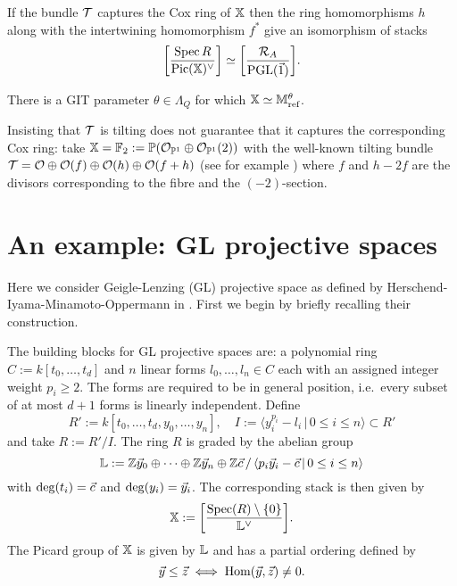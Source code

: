 \documentclass[12pt]{amsart}
\begin{document}
\begin{corollary}
If the bundle $\mathcal{T}$ captures the Cox ring of $\mathbb{X}$ then the ring homomorphisms $h$ along with the intertwining homomorphism $f^*$ give an isomorphism of stacks $$\bigg[\frac{\operatorname{Spec} R}{\operatorname{Pic}(\mathbb{X})^\vee}\bigg] \simeq \bigg[\frac{\mathcal{R}_A}{\operatorname{PGL}(\vec{1})}\bigg].$$
\end{corollary}

\begin{corollary}  \label{cor:stackfromCox}
There is a GIT parameter $\theta \in \Lambda_Q$ for which $\mathbb{X} \simeq \mathbb{M}_\textup{ref}^\theta$.
\end{corollary}

\begin{example}
Insisting that $\mathcal{T}$ is tilting does not guarantee that it captures the corresponding Cox ring: take $\mathbb{X}= \mathbb{F}_2:= \mathbb{P}(\mathcal{O}_{\mathbb{P}^1} \oplus \mathcal{O}_{\mathbb{P}^1}(2))$ with the well-known tilting bundle $\mathcal{T}= \mathcal{O} \oplus \mathcal{O}(f) \oplus \mathcal{O}(h) \oplus \mathcal{O}(f+h)$ (see for example \cite[Proposition~6.3]{C17}) where $f$ and $h-2f$ are the divisors corresponding to the fibre and the $(-2)$-section. 
\end{example}


\section{An example: GL projective spaces}\label{sec:HIMO}

Here we consider Geigle-Lenzing (GL) projective space as defined by Herschend-Iyama-Minamoto-Oppermann in \cite{HIMO}.
First we begin by briefly recalling their construction. 

The building blocks for GL projective spaces are: a polynomial ring $C:= k[t_0, \ldots, t_d]$ and $n$ linear forms $l_0,\ldots,l_n \in C$ each with an assigned integer weight $p_i \geq 2$. 
The forms are required to be in general position, i.e.\ every subset of at most $d+1$ forms is linearly independent. 
Define $$R':= k[t_0,\ldots, t_d, y_0, \ldots, y_n],  \quad I := \langle y_i^{p_i} - l_i \, | \, 0\leq i \leq n \rangle \subset R'$$ and take $R:= R'/I$. 
The ring $R$ is graded by the abelian group $$\mathbb{L}:= \mathbb{Z} {\vec{y}}_0 \oplus \cdots \oplus \mathbb{Z} {\vec{y}}_n \oplus \mathbb{Z} {\vec{c}} \,/\, \langle p_i {\vec{y}}_i - {\vec{c}} \, | \, 0\leq i \leq n \rangle$$ with $\deg(t_i)={\vec{c}}$ and $\deg(y_i) = {\vec{y}}_i$. 
The corresponding stack is then given by $$\mathbb{X}:= \bigg[\frac{\operatorname{Spec}(R) \setminus \{0\}}{\mathbb{L}^\vee}\bigg].$$ 
The Picard group of $\mathbb{X}$ is given by $\mathbb{L}$ and has a partial ordering defined by $${\vec{y}} \leq {\vec{z}} \iff \operatorname{Hom}({\vec{y}}, {\vec{z}}) \neq 0.$$
\end{document}
